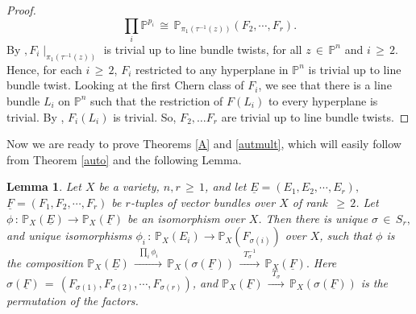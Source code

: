 \documentclass[12pt,reqno]{amsart}
\newtheorem{lemma}{Lemma}[section]
\theoremstyle{definition}
\numberwithin{equation}{section}
\begin{document}
\begin{proof}
$$\prod_{i} \mathbb{P}^{p_i} \,\cong\, \mathbb{P}_{\pi_1( \tau^{-1}(z))}(F_{2},\cdots , F_{r}). $$ 
By {\cite[Theorem 3.17]{BSV1}} $,  F_i \mid_{\pi_1( \tau^{-1}(z))}$ is trivial up to line bundle twists, for all $ z \,\in\, \mathbb{P}^n$ and $i\,\geq \,2$. Hence, for each $i\,\geq\, 2$, $F_i$ restricted to any hyperplane in $\mathbb{P}^n$ is trivial up to line bundle twist. Looking at the first Chern class of $F_i$, we see that there is a line bundle $L_i$ on $\mathbb{P}^n$ such that the restriction of $F(L_i)$ to every hyperplane is trivial. By {\cite[Theorem 3.2.1]{Ok}}, $F_i(L_i)$ is trivial. So, $F_{2}, \dots F_{r}$ are trivial up to line bundle twists.
\end{proof}
Now we are ready to prove Theorems \ref{A} and \ref{autmult}, which will easily follow from Theorem \ref{auto} and the following Lemma.
 \begin{lemma} \label{iso}
      Let $X$ be a variety, $n,r \,\geq\, 1$, and  let $\underline{E}=(E_1, E_2,\cdots, E_r),$ $ \underline{F}=(F_1, F_2,\cdots, F_r)$ be $r$-tuples of vector bundles over $X$ of rank $\,\geq\, 2$. Let $\phi\,:\, \mathbb{P}_{X}(\underline{E}) \to \mathbb{P}_{X}(\underline{F})$ be an isomorphism over $X$. Then there is unique $\sigma\,\in\, S_r,$ and unique isomorphisms $\phi_i\,:\, \mathbb{P}_{X}(E_i) \to \mathbb{P}_{X}(F_{\sigma(i)})$ over $X$, such that $\phi$ is the composition $\mathbb{P}_{X}(\underline{E})\,\xrightarrow{\,\,\,\prod_i \phi_i\,\,\,}\, \mathbb{P}_{X}(\sigma(\underline{F}))\,\xrightarrow{\,\,\,T_{\sigma}^{-1}\,\,\,}\, \mathbb{P}_{X}(\underline{F}).$ Here $\sigma(\underline{F})\,=\,(F_{\sigma(1)}, F_{\sigma(2)},\cdots, F_{\sigma(r)})$, and $\mathbb{P}_{X}(\underline{F})\,\xrightarrow{\,\,\,T_{\sigma}\,\,\,}\, \mathbb{P}_{X}(\sigma(\underline{F}))$ is the permutation of the factors.
  \end{lemma}
\end{document}
